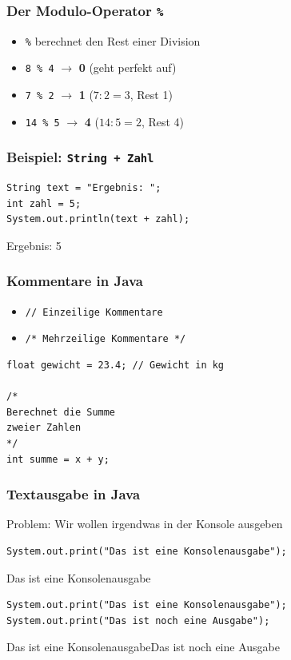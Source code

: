 \documentclass{../../presentation}
\begin{document}
\begin{frame}[fragile]
	\frametitle{Der Modulo-Operator \texttt{\%}}
	\pause
	\begin{itemize}
		\item \texttt{\%} berechnet den Rest einer Division
	\end{itemize}
	\pause
	\vspace{0.8em}
	\begin{itemize}
		\item \texttt{8 \% 4} \quad $\rightarrow$ \quad \textbf{0} \quad (geht perfekt auf)
		      \pause
		\item \texttt{7 \% 2} \quad $\rightarrow$ \quad \textbf{1} \quad ($7 : 2 = 3$, Rest 1)
		      \pause
		\item \texttt{14 \% 5} \quad $\rightarrow$ \quad \textbf{4} \quad ($14 : 5 = 2$, Rest 4)
	\end{itemize}
\end{frame}

\begin{frame}[fragile]
	\frametitle{Beispiel: \texttt{String + Zahl}}
	\pause
	\begin{verbatim}
String text = "Ergebnis: ";
int zahl = 5;
System.out.println(text + zahl);
  \end{verbatim}
	\pause
	\begin{ausgabe}
		Ergebnis: 5
	\end{ausgabe}
\end{frame}

\begin{frame}[fragile]
	\frametitle{Kommentare in Java}
	\pause
	\begin{itemize}
		\item \texttt{// Einzeilige Kommentare}
		\item \texttt{/* Mehrzeilige Kommentare */}
	\end{itemize}
	\pause
	\vspace{1em}
	\begin{verbatim}
float gewicht = 23.4; // Gewicht in kg

/*
Berechnet die Summe
zweier Zahlen
*/
int summe = x + y;
  \end{verbatim}
\end{frame}

\begin{frame}[fragile]
	\frametitle{Textausgabe in Java}
	\pause
	Problem: Wir wollen irgendwas in der Konsole ausgeben
	\pause
	\vspace{0.5em}
	\begin{verbatim}
System.out.print("Das ist eine Konsolenausgabe");
  \end{verbatim}
	\begin{ausgabe}
		Das ist eine Konsolenausgabe
	\end{ausgabe}
	\pause
	\begin{verbatim}
System.out.print("Das ist eine Konsolenausgabe");
System.out.print("Das ist noch eine Ausgabe");
  \end{verbatim}
	\pause
	\begin{ausgabe}
		Das ist eine KonsolenausgabeDas ist noch eine Ausgabe
	\end{ausgabe}
\end{frame}
\end{document}
